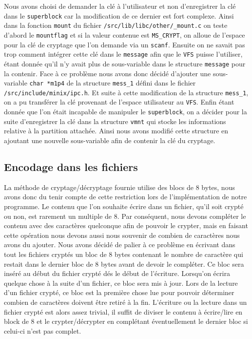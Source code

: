 \documentclass[10pt, onecolumn] {IEEEtran}
\begin{document}
Nous avons choisi de demander la clé à l'utilisateur et non d'enregistrer la clé dans le \texttt{superblock} car la modification de ce dernier est fort complexe. Ainsi dans la fonction \texttt{mount} du fichier \texttt{/src/lib/libc/other/\_mount.c} on teste d'abord le \texttt{mountflag} et si la valeur contenue est \texttt{MS\_CRYPT}, on alloue de l'espace pour la clé de cryptage que l'on demande via un \texttt{scanf}. Ensuite on ne savait pas trop comment intégrer cette clé dans le \texttt{message} afin que le \texttt{VFS} puisse l'utiliser, étant donnée qu'il n'y avait plus de sous-variable dans le structure \texttt{message} pour la contenir. Face à ce problème nous avons donc décidé d'ajouter une sous-variable \texttt{char *m1p4} de la structure \texttt{mess\_1} défini dans le fichier \texttt{/src/include/minix/ipc.h}. Et suite à cette modification de la structure \texttt{mess\_1}, on a pu transférer la clé provenant de l'espace utilisateur au \texttt{VFS}. Enfin étant donnée que l'on était incapable de manipuler le \texttt{superblock}, on a décider pour la suite d'enregistrer la clé dans la structure \texttt{vmnt} qui stocke les informations relative à la partition attachée. Ainsi nous avons modifié cette structure en ajoutant une nouvelle sous-variable afin de contenir la clé du cryptage.     

\subsection{Encodage dans les fichiers}

La méthode de cryptage/décryptage fournie utilise des blocs de 8 bytes, nous avons donc du tenir compte de cette restriction lors de l'implémentation de notre programme. Le contenu que l'on souhaite écrire dans un fichier, qu'il soit crypté ou non, est rarement un multiple de 8. Par conséquent, nous devons compléter le contenu avec des caractères quelconque afin de pouvoir le crypter, mais en faisant cette opération nous devons aussi nous souvenir de combien de caractères nous avons du ajouter. Nous avons décidé de palier à ce problème en écrivant dans tout les fichiers cryptés un bloc de 8 bytes contenant le nombre de caractère qui restait dans le dernier bloc de 8 bytes avant de devoir le compléter. Ce bloc sera inséré au début du fichier crypté dés le début de l'écriture. Lorsqu'on écrira quelque chose à la suite d'un fichier, ce bloc sera mis à jour. Lors de la lecture d'un fichier crypté, ce bloc est la première chose lue pour pouvoir déterminer combien de caractères doivent être retiré à la fin.
L'écriture ou la lecture dans un fichier crypté est alors assez trivial, il suffit de diviser le contenu à écrire/lire en block de 8 et le crypter/décrypter en complétant éventuellement le dernier bloc si celui-ci n'est pas complet.
\end{document}
